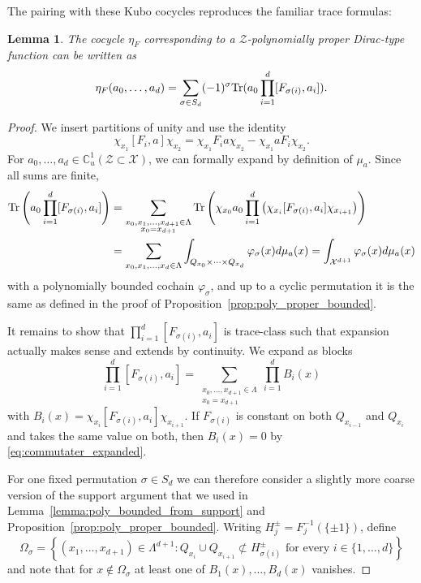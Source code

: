 \documentclass[12pt]{amsart}
\newtheorem{lemma}[theorem]{Lemma}
\newcommand{\CM}{{\mathbb C}}
\newcommand{\Xx}{{\mathcal X}}
\newcommand{\Zz}{{\mathcal Z}}
\newcommand{\Tr}{\mbox{\rm Tr}}
\begin{document}
The pairing with these Kubo cocycles reproduces the familiar trace formulas:
\begin{lemma}\label{lem:cyclic_convergence}
The cocycle $\eta_F$ corresponding to a $\Zz$-polynomially proper Dirac-type function can be written as
$$\eta_F(a_0,\dots,a_d) = \sum_{\sigma\in S_{d}}(-1)^\sigma \Tr(a_{0}\prod_{i=1}^{d} [F_{\sigma{(i)}}, a_i]).$$
\end{lemma}
\begin{proof}
We insert partitions of unity and use the identity
\begin{equation}
\label{eq:commutater_expanded}
\chi_{x_1} [F_i, a] \chi_{x_2} = \chi_{x_1} F_i a \chi_{x_2} -  \chi_{x_1} a F_i \chi_{x_2}.
\end{equation}
For $a_0,\ldots,a_d\in \CM_u^1(\Zz\subset\Xx)$, we can formally expand by definition of $\mu_a$.
Since all sums are finite,
\begin{align*}
\Tr\left(a_{0}\prod_{i=1}^{d} [F_{\sigma{(i)}}, a_i]\right) &=  \sum_{\substack{x_0,x_1,\dots,x_{d+1} \in \Lambda\\ x_0=x_{d+1}}}  \Tr\left(\chi_{x_0} a_0 \prod_{i=1}^{d} \left(\chi_{x_{i}}[F_{\sigma{(i)}}, a_i]\chi_{x_{i+1}}\right)\right)\\
&= \sum_{x_0,x_1,\dots, x_d \in \Lambda} \int_{Q_{x_0}\times \dots\times Q_{x_d}} \varphi_\sigma(x) d\mu_a(x)=\int_{\Xx^{d+1}} \varphi_\sigma(x) d\mu_a(x)
\end{align*}
with a polynomially bounded cochain $\varphi_\sigma$, and up to a cyclic permutation it is the same as defined in the proof of  Proposition~\ref{prop:poly_proper_bounded}.


It remains to show that $\prod_{i=1}^{d} [F_{\sigma{(i)}},a_i]$ is trace-class such that expansion actually makes sense and extends by continuity. We expand as blocks
\begin{equation}
\label{eq:product_expansion}
\prod_{i=1}^{d} [F_{\sigma{(i)}},a_i]= \sum_{\substack{x_0,\ldots,x_{d+1} \in \Lambda\\x_0=x_{d+1}}} \prod_{i=1}^{d} B_i(x)
\end{equation}
with $B_i(x)=\chi_{x_{i}}[F_{\sigma{(i)}},a_i] \chi_{x_{i+1}}$. If $F_{\sigma(i)}$ is constant on both $Q_{x_{i-1}}$ and $Q_{x_{i}}$ and takes the same value on both, then $B_i(x)=0$ by \eqref{eq:commutater_expanded}.

For one fixed permutation $\sigma\in S_d$ we can therefore consider a slightly more coarse version of the support argument that we used in Lemma~\ref{lemma:poly_bounded_from_support} and Proposition~\ref{prop:poly_proper_bounded}.
Writing \(H_j^\pm=F_j^{-1}(\{\pm1\})\), define 
$$\Omega_\sigma =\left\{(x_1,\ldots,x_{d+1})\in\Lambda^{d+1}: Q_{x_{i}}\cup Q_{x_{i+1}}\not\subset H_{\sigma(i)}^\pm \text{ for every }i \in \{1,\dots, d\}\right\}$$
and note that for $x\notin \Omega_\sigma$ at least one of $B_1(x),\ldots, B_d(x)$ vanishes.


\end{proof}
\end{document}
